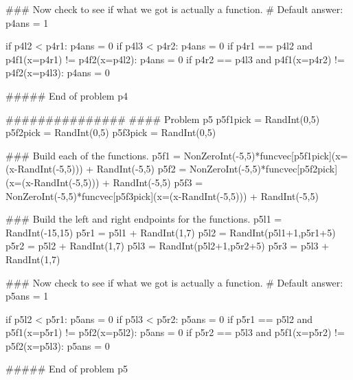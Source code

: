 \documentclass{ximera}
\begin{document}
\begin{sagesilent}
### Now check to see if what we got is actually a function.
# Default answer:
p4ans = 1

if p4l2 < p4r1:
    p4ans = 0
if p4l3 < p4r2:
    p4ans = 0
if p4r1 == p4l2 and p4f1(x=p4r1) != p4f2(x=p4l2):
    p4ans = 0
if p4r2 == p4l3 and p4f1(x=p4r2) != p4f2(x=p4l3):
    p4ans = 0

##### End of problem p4




###############
#### Problem p5
p5f1pick = RandInt(0,5)
p5f2pick = RandInt(0,5)
p5f3pick = RandInt(0,5)

### Build each of the functions.
p5f1 = NonZeroInt(-5,5)*funcvec[p5f1pick](x=(x-RandInt(-5,5))) + RandInt(-5,5)
p5f2 = NonZeroInt(-5,5)*funcvec[p5f2pick](x=(x-RandInt(-5,5))) + RandInt(-5,5)
p5f3 = NonZeroInt(-5,5)*funcvec[p5f3pick](x=(x-RandInt(-5,5))) + RandInt(-5,5)

### Build the left and right endpoints for the functions.
p5l1 = RandInt(-15,15)
p5r1 = p5l1 + RandInt(1,7)
p5l2 = RandInt(p5l1+1,p5r1+5)
p5r2 = p5l2 + RandInt(1,7)
p5l3 = RandInt(p5l2+1,p5r2+5)
p5r3 = p5l3 + RandInt(1,7)

### Now check to see if what we got is actually a function.
# Default answer:
p5ans = 1

if p5l2 < p5r1:
    p5ans = 0
if p5l3 < p5r2:
    p5ans = 0
if p5r1 == p5l2 and p5f1(x=p5r1) != p5f2(x=p5l2):
    p5ans = 0
if p5r2 == p5l3 and p5f1(x=p5r2) != p5f2(x=p5l3):
    p5ans = 0

##### End of problem p5






\end{sagesilent}
\end{document}
